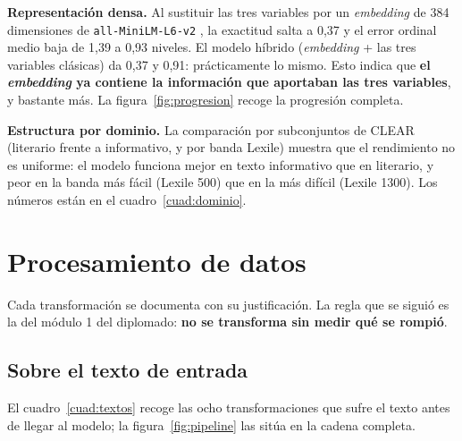 \documentclass[11pt,a4paper]{article}
\newcommand{\cod}[1]{\texttt{\small #1}}
\begin{document}
\textbf{Representación densa.} Al sustituir las tres variables por un \emph{embedding} de
384 dimensiones de \cod{all-MiniLM-L6-v2} \parencite{reimers2019sentence}, la exactitud
salta a 0,37 y el error ordinal medio baja de 1,39 a 0,93 niveles. El modelo híbrido
(\emph{embedding} + las tres variables clásicas) da 0,37 y 0,91: prácticamente lo mismo.
Esto indica que \textbf{el \emph{embedding} ya contiene la información que aportaban las
tres variables}, y bastante más. La figura~\ref{fig:progresion} recoge la progresión
completa.

\textbf{Estructura por dominio.} La comparación por subconjuntos de CLEAR (literario
frente a informativo, y por banda Lexile) muestra que el rendimiento no es uniforme: el
modelo funciona mejor en texto informativo que en literario, y peor en la banda más
fácil (Lexile 500) que en la más difícil (Lexile 1300). Los números están en el
cuadro~\ref{cuad:dominio}.

\section{Procesamiento de datos}
\label{sec:procesamiento}

Cada transformación se documenta con su justificación. La regla que se siguió es la del
módulo 1 del diplomado: \textbf{no se transforma sin medir qué se rompió}.

\subsection{Sobre el texto de entrada}
\label{sec:proc_texto}

El cuadro~\ref{cuad:textos} recoge las ocho transformaciones que sufre el texto antes de
llegar al modelo; la figura~\ref{fig:pipeline} las sitúa en la cadena completa.
\end{document}
